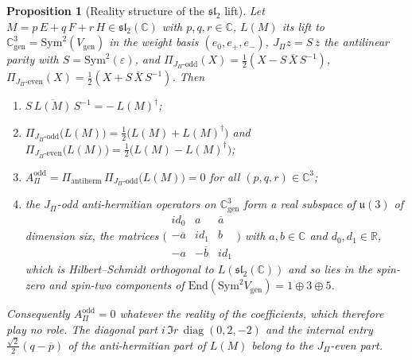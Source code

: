 \documentclass[11pt]{article}
\newtheorem{proposition}{Proposition}
\theoremstyle{definition}
\theoremstyle{remark}
\newcommand{\JPi}{J_{\Pi}}
\newcommand{\Cgen}{\mathbb{C}^{3}_{\mathrm{gen}}}
\newcommand{\Aodd}{A_{\Pi}^{\mathrm{odd}}}
\newcommand{\Sym}{\mathrm{Sym}}
\newcommand{\diag}{\operatorname{diag}}
\begin{document}
    \begin{proposition}[Reality structure of the $\mathfrak{sl}_{2}$ lift]
      \label{prop:reality-structure}
      Let $M = p\,E + q\,F + r\,H \in \mathfrak{sl}_{2}(\mathbb{C})$ with $p, q, r \in \mathbb{C}$, $L(M)$ its lift to
      $\Cgen = \Sym^{2}(V_{\mathrm{gen}})$ in the weight basis $(e_{0}, e_{+}, e_{-})$, $\JPi z = S\,\overline{z}$ the
      antilinear parity with $S = \Sym^{2}(\varepsilon)$, and $\Pi_{\JPi\text{-odd}}(X) =
      \tfrac12(X - S\,\overline{X}\,S^{-1})$, $\Pi_{\JPi\text{-even}}(X) = \tfrac12(X + S\,\overline{X}\,S^{-1})$.
      Then
      \begin{enumerate}
        \item[\emph{(i)}] $S\,\overline{L(M)}\,S^{-1} = -\,L(M)^{\dagger}$;
        \item[\emph{(ii)}] $\Pi_{\JPi\text{-odd}}\big(L(M)\big) = \tfrac12\big(L(M) + L(M)^{\dagger}\big)$ and
          $\Pi_{\JPi\text{-even}}\big(L(M)\big) = \tfrac12\big(L(M) - L(M)^{\dagger}\big)$;
        \item[\emph{(iii)}] $\Aodd = \Pi_{\mathrm{antiherm}}\,\Pi_{\JPi\text{-odd}}\big(L(M)\big) = 0$ for all
          $(p, q, r) \in \mathbb{C}^{3}$;
        \item[\emph{(iv)}] the $\JPi$-odd anti-hermitian operators on $\Cgen$ form a real subspace of $\mathfrak{u}(3)$
        of
          dimension six, the matrices $\bigl(\begin{smallmatrix} i d_{0} & a & \overline{a} \\ -\overline{a} & i d_{1} &
          b \\
          -a & -\overline{b} & i d_{1} \end{smallmatrix}\bigr)$ with $a, b \in \mathbb{C}$ and $d_{0}, d_{1} \in
          \mathbb{R}$,
          which is Hilbert--Schmidt orthogonal to $L(\mathfrak{sl}_{2}(\mathbb{C}))$ and so lies in the spin-zero and
          spin-two components of $\mathrm{End}(\Sym^{2} V_{\mathrm{gen}}) = 1 \oplus 3 \oplus 5$.
      \end{enumerate}
      Consequently $\Aodd = 0$ whatever the reality of the coefficients, which therefore play no role.
      The diagonal part $i\,\Im r\,\diag(0, 2, -2)$ and the internal entry $\tfrac{\sqrt2}{2}(q - \overline{p})$ of the
      anti-hermitian part of $L(M)$ belong to the $\JPi$-even part.
    \end{proposition}
\end{document}
